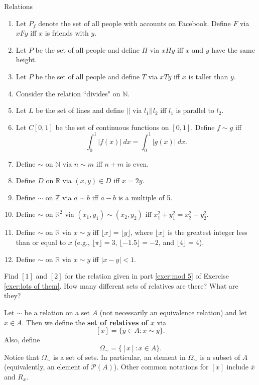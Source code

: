 \begin{section}{Relations}
\begin{exercise}
\begin{enumerate}\label{exer:lots of them}
\item\label{exer:facebook} Let $P_f$ denote the set of all people with accounts on Facebook.  Define  $F$ via $xFy$ iff $x$ is friends with $y$. 
\item Let $P$ be the set of all people and define $H$ via $xHy$ iff $x$ and $y$ have the same height.
\item Let $P$ be the set of all people and define $T$ via $xTy$ iff $x$ is taller than $y$.
\item Consider the relation ``divides" on $\mathbb{N}$.
\item Let $L$ be the set of lines and define $||$ via $l_1||l_2$ iff $l_1$ is parallel to $l_2$.
\item Let $C[0,1]$ be the set of continuous functions on $[0,1]$.  Define $f\sim g$ iff
\[
\int_0^1|f(x)|\ dx=\int_0^1|g(x)|\ dx.
\]
\item Define $\sim$ on $\mathbb{N}$ via $n\sim m$ iff $n+m$ is even.
\item Define $D$ on $\mathbb{R}$ via $(x,y)\in D$ iff $x=2y$.
\item\label{exer:mod 5} Define $\sim$ on $\mathbb{Z}$ via $a\sim b$ iff $a-b$ is a multiple of 5.
\item Define $\sim$ on $\mathbb{R}^2$ via $(x_1,y_1)\sim (x_2,y_2)$ iff $x_1^2+y_1^2=x_2^2+y_2^2$.
\item Define $\sim$ on $\mathbb{R}$ via $x\sim y$ iff $\lfloor x\rfloor =\lfloor y\rfloor$, where $\lfloor x\rfloor$ is the greatest integer less than or equal to $x$ (e.g., $\lfloor \pi\rfloor=3$, $\lfloor -1.5\rfloor=-2$, and $\lfloor 4\rfloor=4$).
\item Define $\sim$ on $\mathbb{R}$ via $x \sim y$ iff $|x-y|<1$.
\end{enumerate}
\end{exercise}

\begin{exercise}
Find $[1]$ and $[2]$ for the relation given in part \ref{exer:mod 5} of Exercise \ref{exer:lots of them}.  How many different sets of relatives are there?  What are they?
\end{exercise}

\begin{definition}
Let $\sim$ be a relation on a set $A$ (not necessarily an equivalence relation) and let $x\in A$.  Then we define the \textbf{set of relatives of $x$} via
\[
[x]=\{y\in A: x\sim y\}.
\]
Also, define
\[
\Omega_{\sim}=\{[x]:x\in A\}.
\]
Notice that $\Omega_{\sim}$ is a set of sets.  In particular, an element in $\Omega_{\sim}$ is a subset of $A$ (equivalently, an element of $\mathcal{P}(A)$).  Other common notations for $[x]$ include $\overline{x}$ and $R_x$.
\end{definition}


\end{section}
